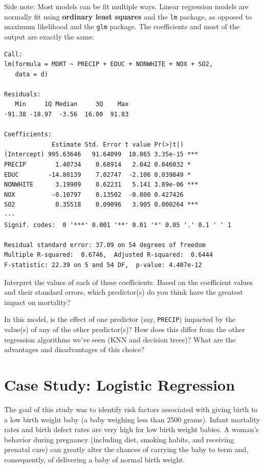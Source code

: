 Side note: Most models can be fit multiple ways. Linear regression models are normally fit using \textbf{ordinary least squares} and the \verb|lm| package, as opposed to maximum likelihood and the \verb|glm| package. The coefficients and most of the output are exactly the same:

{\small
\begin{verbatim}
Call:
lm(formula = MORT ~ PRECIP + EDUC + NONWHITE + NOX + SO2, 
   data = d)

Residuals:
   Min     1Q Median     3Q    Max 
-91.38 -18.97  -3.56  16.00  91.83 

Coefficients:
             Estimate Std. Error t value Pr(>|t|)    
(Intercept) 995.63646   91.64099  10.865 3.35e-15 ***
PRECIP        1.40734    0.68914   2.042 0.046032 *  
EDUC        -14.80139    7.02747  -2.106 0.039849 *  
NONWHITE      3.19909    0.62231   5.141 3.89e-06 ***
NOX          -0.10797    0.13502  -0.800 0.427426    
SO2           0.35518    0.09096   3.905 0.000264 ***
---
Signif. codes:  0 '***' 0.001 '**' 0.01 '*' 0.05 '.' 0.1 ' ' 1

Residual standard error: 37.09 on 54 degrees of freedom
Multiple R-squared:  0.6746,  Adjusted R-squared:  0.6444 
F-statistic: 22.39 on 5 and 54 DF,  p-value: 4.407e-12
\end{verbatim}
}

\begin{question}{}
Interpret the values of each of these coefficients. Based on the coefficient values and their standard errors, which predictor(s) do you think have the greatest impact on mortality? 
\end{question}

\begin{question}{}
In this model, is the effect of one predictor (say, \verb|PRECIP|) impacted by the value(s) of any of the other predictor(s)? How does this differ from the other regression algorithms we've seen (KNN and decision trees)? What are the advantages and disadvantages of this choice? 
\end{question}


\section{Case Study: Logistic Regression}

The goal of this study was to identify risk factors associated with giving birth to a low birth weight baby (a baby weighing less than 2500 grams). Infant mortality rates and birth defect rates are very high for low birth weight babies. A woman's behavior during pregnancy (including diet, smoking habits, and receiving prenatal care) can greatly alter the chances of carrying the baby to term and, consequently, of delivering a baby of normal birth weight.

